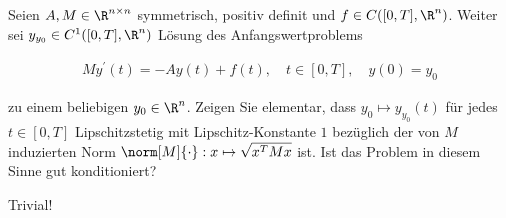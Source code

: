 \begin{exercise}

Seien $A, M \in \R^{n \times n}$ symmetrisch, positiv definit und $f \in C([0, T], \R^n)$. Weiter sei $y_{y_0} \in C^1([0, T], \R^n)$ Lösung des Anfangswertproblems

\begin{align*}
  M y^\prime(t) = -A y(t) + f(t),
  \quad
  t \in [0, T],
  \quad
  y(0) = y_0
\end{align*}

zu einem beliebigen $y_0 \in \R^n$.
Zeigen Sie elementar, dass $y_0 \mapsto y_{y_0}(t)$ für jedes $t \in [0, T]$ Lipschitzstetig mit Lipschitz-Konstante $1$ bezüglich der von $M$ induzierten Norm $\norm[M]{\cdot}: x \mapsto \sqrt{x^T M x}$ ist.
Ist das Problem in diesem Sinne gut konditioniert?

\end{exercise}

\begin{solution}

Trivial!

\end{solution}
